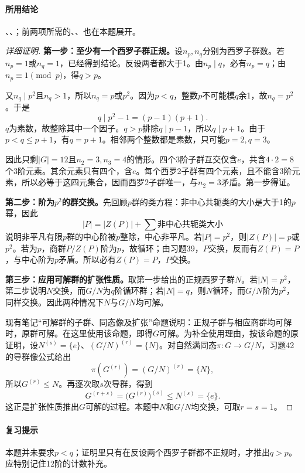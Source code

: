 \paragraph{所用结论}、、；前两项所需的、、也在本题展开。
\begin{proof}[详细证明]
\textbf{第一步：至少有一个西罗子群正规。}设$n_p,n_q$分别为西罗子群数。若$n_p=1$或$n_q=1$，已经得到结论。反设两者都大于1。由$n_p\mid q$，必有$n_p=q$；由$n_p\equiv1\pmod p$，得$q>p$。

又$n_q\mid p^2$且$n_q>1$，所以$n_q=p$或$p^2$。因为$p<q$，整数$p$不可能模$q$余1，故$n_q=p^2$。于是
\[
q\mid p^2-1=(p-1)(p+1).
\]
$q$为素数，故整除其中一个因子。$q>p$排除$q\mid p-1$，所以$q\mid p+1$。由于$p<q\le p+1$，有$q=p+1$。相邻两个整数都是素数，只可能$p=2,q=3$。

因此只剩$|G|=12$且$n_2=3,n_3=4$的情形。四个3阶子群互交仅含$e$，共含$4\cdot2=8$个3阶元素。其余元素只有四个，含$e$。每个西罗2子群有四个元素，且不能含3阶元素，所以必等于这四元集合，因而西罗2子群唯一，与$n_2=3$矛盾。第一步得证。

\textbf{第二步：阶为$p^2$的群交换。}先回顾$p$群的类方程：非中心共轭类的大小是大于1的$p$幂，因此
\[
|P|=|Z(P)|+\sum\text{非中心共轭类大小}
\]
说明非平凡有限$p$群的中心阶被$p$整除，中心非平凡。若$|P|=p^2$，则$|Z(P)|=p$或$p^2$。若为$p$，商群$P/Z(P)$阶为$p$，故循环；由习题39，$P$交换，反而有$Z(P)=P$，与中心阶为$p$矛盾。所以必有$Z(P)=P$，$P$交换。

\textbf{第三步：应用可解群的扩张性质。}取第一步给出的正规西罗子群$N$。若$|N|=p^2$，第二步说明$N$交换，而$G/N$为$q$阶循环群；若$|N|=q$，则$N$循环，而$G/N$阶为$p^2$，同样交换。因此两种情况下$N$与$G/N$均可解。

现有笔记“可解群的子群、同态像及扩张”命题说明：正规子群与相应商群均可解时，原群可解。在这里使用该命题，即得$G$可解。为补全使用理由，按该命题的原证明，设$N^{(s)}=\{e\}$、$(G/N)^{(r)}=\{N\}$。对自然满同态$\pi:G\to G/N$，习题42的导群像公式给出
\[
\pi(G^{(r)})=(G/N)^{(r)}=\{N\},
\]
所以$G^{(r)}\le N$。再逐次取$s$次导群，得到
\[
G^{(r+s)}=\bigl(G^{(r)}\bigr)^{(s)}\le N^{(s)}=\{e\}.
\]
这正是扩张性质推出$G$可解的过程。本题中$N$和$G/N$均交换，可取$r=s=1$。
\end{proof}
\paragraph{复习提示}本题并未要求$p<q$；证明里只有在反设两个西罗子群都不正规时，才推出$q>p$。应特别记住12阶的计数补充。

